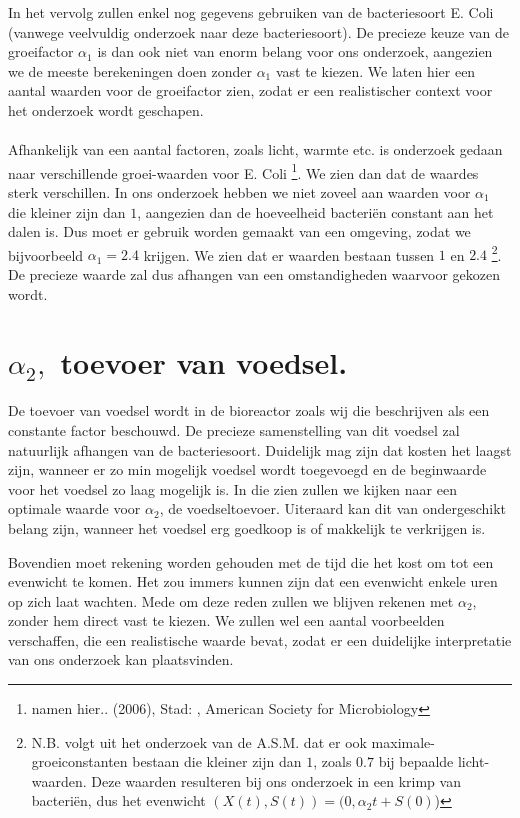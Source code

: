 In het vervolg zullen enkel nog gegevens gebruiken van de bacteriesoort E. Coli (vanwege veelvuldig onderzoek naar deze bacteriesoort). De precieze keuze van de groeifactor $\alpha_1$ is dan ook niet van enorm belang voor ons onderzoek, aangezien we de meeste berekeningen doen zonder $\alpha_1$ vast te kiezen. We laten hier een aantal waarden voor de groeifactor zien, zodat er een realistischer context voor het onderzoek wordt geschapen. 
\\
\\
Afhankelijk van een aantal factoren, zoals licht, warmte etc. is onderzoek gedaan naar verschillende groei-waarden voor E. Coli \footnote{namen hier.. (2006), Stad: , American Society for Microbiology}. We zien dan dat de waardes sterk verschillen. In ons onderzoek hebben we niet zoveel aan waarden voor $\alpha_1$ die kleiner zijn dan $1$, aangezien dan de hoeveelheid bacteri\"en constant aan het dalen is. Dus moet er gebruik worden gemaakt van een omgeving, zodat we bijvoorbeeld $\alpha_1 = 2.4$ krijgen. We zien dat er waarden bestaan tussen $1$ en $2.4$ \footnote{N.B. volgt uit het onderzoek van de A.S.M. dat er ook maximale-groeiconstanten bestaan die kleiner zijn dan $1$, zoals $0.7$ bij bepaalde licht-waarden. Deze waarden resulteren bij ons onderzoek in een krimp van bacteri\"en, dus het evenwicht $(X(t), S(t)) = (0, \alpha_2t + S(0)$) }. De precieze waarde zal dus afhangen van een omstandigheden waarvoor gekozen wordt.


\section{$\alpha_2,$ toevoer van voedsel.}
De toevoer van voedsel wordt in de bioreactor zoals wij die beschrijven als een constante factor beschouwd. De precieze samenstelling van dit voedsel zal natuurlijk afhangen van de bacteriesoort. Duidelijk mag zijn dat kosten het laagst zijn, wanneer er zo min mogelijk voedsel wordt toegevoegd en de beginwaarde voor het voedsel zo laag mogelijk is. In die zien zullen we kijken naar een optimale waarde voor $\alpha_2$, de voedseltoevoer. Uiteraard kan dit van ondergeschikt belang zijn, wanneer het voedsel erg goedkoop is of makkelijk te verkrijgen is. 

Bovendien moet rekening worden gehouden met de tijd die het kost om tot een evenwicht te komen. Het zou immers kunnen zijn dat een evenwicht enkele uren op zich laat wachten. Mede om deze reden zullen we blijven rekenen met $\alpha_2$, zonder hem direct vast te kiezen. We zullen wel een aantal voorbeelden verschaffen, die een realistische waarde bevat, zodat er een duidelijke interpretatie van ons onderzoek kan plaatsvinden. 


